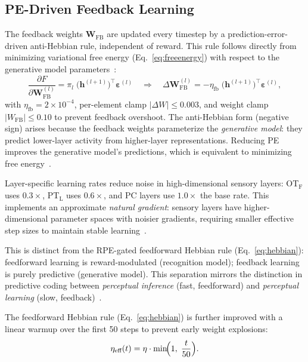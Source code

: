 \documentclass[11pt,a4paper]{article}
\begin{document}
\subsection{PE-Driven Feedback Learning}\label{sec:feedback_learning}

The feedback weights $\mathbf{W}_\text{FB}$ are updated every timestep by
a prediction-error-driven anti-Hebbian rule, independent of reward.
This rule follows directly from minimizing variational free energy
(Eq.~\ref{eq:freeenergy}) with respect to the generative model
parameters~\cite{bogacz2017,rao1999}:
\begin{equation}\label{eq:fe_gradient}
  \frac{\partial F}{\partial \mathbf{W}_\text{FB}^{(l)}}
  = \pi_l\;\bigl(\mathbf{h}^{(l+1)}\bigr)^\top\boldsymbol{\varepsilon}^{(l)}
  \quad\Longrightarrow\quad
  \Delta\mathbf{W}_\text{FB}^{(l)} =
    -\eta_\text{fb}\;\bigl(\mathbf{h}^{(l+1)}\bigr)^\top
    \boldsymbol{\varepsilon}^{(l)},
\end{equation}
with $\eta_\text{fb} = 2 \times 10^{-4}$,
per-element clamp $|\Delta W| \leq 0.003$, and weight clamp
$|W_\text{FB}| \leq 0.10$ to prevent feedback overshoot.
The anti-Hebbian form (negative sign) arises because the
feedback weights parameterize the \emph{generative model}: they predict
lower-layer activity from higher-layer representations.
Reducing PE improves the generative model's predictions, which is
equivalent to minimizing free energy~\cite{friston2010}.

Layer-specific learning rates reduce noise in high-dimensional sensory
layers: OT$_\text{F}$ uses $0.3\times$, PT$_\text{L}$ uses $0.6\times$,
and PC layers use $1.0\times$ the base rate.
This implements an approximate \emph{natural gradient}: sensory layers
have higher-dimensional parameter spaces with noisier gradients,
requiring smaller effective step sizes to maintain stable
learning~\cite{bogacz2017}.

This is distinct from the RPE-gated feedforward Hebbian rule
(Eq.~\ref{eq:hebbian}): feedforward learning is reward-modulated
(recognition model); feedback learning is purely predictive
(generative model).
This separation mirrors the distinction in predictive coding between
\emph{perceptual inference} (fast, feedforward) and \emph{perceptual
learning} (slow, feedback)~\cite{rao1999,clark2013}.

The feedforward Hebbian rule (Eq.~\ref{eq:hebbian}) is further improved
with a linear warmup over the first 50 steps to prevent early weight
explosions:
\begin{equation}\label{eq:warmup}
  \eta_\text{eff}(t) = \eta \cdot \min\!\Bigl(1,\;\frac{t}{50}\Bigr).
\end{equation}
\end{document}

